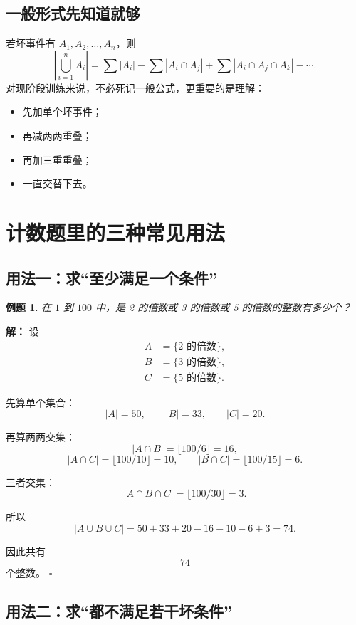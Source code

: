 \documentclass[11pt,a4paper,fontset=fandol]{ctexart}
\theoremstyle{formaltheorem}
\theoremstyle{formalexample}
\newtheorem{example}{例题}[section]
\newenvironment{solution}{\par\noindent\textbf{解：}}{\hfill$\square$\par}
\begin{document}
\subsection{一般形式先知道就够}
若坏事件有 $A_1,A_2,\ldots,A_n$，则
\[
\left|\bigcup_{i=1}^n A_i\right|
=\sum |A_i|-
\sum |A_i\cap A_j|+
\sum |A_i\cap A_j\cap A_k|-\cdots.
\]
对现阶段训练来说，不必死记一般公式，更重要的是理解：
\begin{itemize}
  \item 先加单个坏事件；
  \item 再减两两重叠；
  \item 再加三重重叠；
  \item 一直交替下去。
\end{itemize}

\section{计数题里的三种常见用法}

\subsection{用法一：求“至少满足一个条件”}

\begin{example}
在 $1$ 到 $100$ 中，是 2 的倍数或 3 的倍数或 5 的倍数的整数有多少个？
\end{example}

\begin{solution}
设
\begin{align*}
A&=\{\text{2 的倍数}\},\\
B&=\{\text{3 的倍数}\},\\
C&=\{\text{5 的倍数}\}.
\end{align*}

先算单个集合：
\[
|A|=50,\qquad |B|=33,\qquad |C|=20.
\]

再算两两交集：
\[
|A\cap B|=\lfloor 100/6\rfloor=16,
\]
\[
|A\cap C|=\lfloor 100/10\rfloor=10,
\qquad
|B\cap C|=\lfloor 100/15\rfloor=6.
\]

三者交集：
\[
|A\cap B\cap C|=\lfloor 100/30\rfloor=3.
\]

所以
\[
|A\cup B\cup C|=50+33+20-16-10-6+3=74.
\]

因此共有
\[
74
\]
个整数。
\end{solution}

\subsection{用法二：求“都不满足若干坏条件”}
\end{document}

